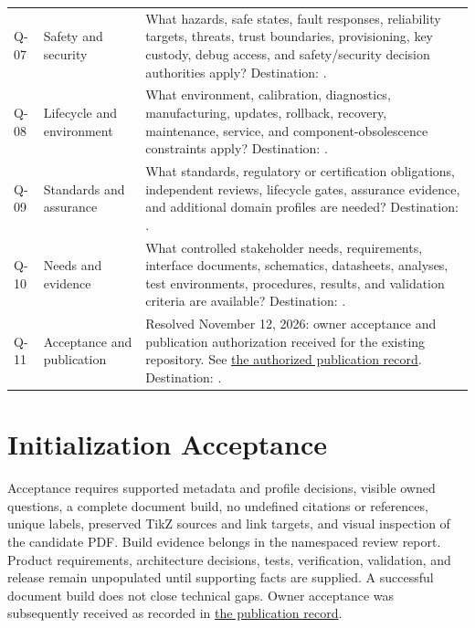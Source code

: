 \begin{tabularx}{\linewidth}{L{1.0cm}L{3.0cm}Y}
\label{Question:Q-07}Q-07 & Safety and security & What hazards, safe states, fault responses, reliability targets, threats, trust boundaries, provisioning, key custody, debug access, and safety/security decision authorities apply? Destination: .\\
\label{Question:Q-08}Q-08 & Lifecycle and environment & What environment, calibration, diagnostics, manufacturing, updates, rollback, recovery, maintenance, service, and component-obsolescence constraints apply? Destination: .\\
\label{Question:Q-09}Q-09 & Standards and assurance & What standards, regulatory or certification obligations, independent reviews, lifecycle gates, assurance evidence, and additional domain profiles are needed? Destination: .\\
\label{Question:Q-10}Q-10 & Needs and evidence & What controlled stakeholder needs, requirements, interface documents, schematics, datasheets, analyses, test environments, procedures, results, and validation criteria are available? Destination: .\\
\label{Question:Q-11}Q-11 & Acceptance and publication & Resolved November 12, 2026: owner acceptance and publication authorization received for the existing repository. See \hyperref[Section:InitializationPublication]{the authorized publication record}. Destination: .\\
\end{tabularx}
\normalsize

\section{Initialization Acceptance}
\label{Section:InitializationAcceptance}
Acceptance requires supported metadata and profile decisions, visible owned
questions, a complete document build, no undefined citations or references,
unique labels, preserved TikZ sources and link targets, and visual inspection
of the candidate PDF. Build evidence belongs in the namespaced review report.
Product requirements, architecture decisions, tests, verification, validation,
and release remain unpopulated until supporting facts are supplied.
A successful document build does not close technical gaps. Owner acceptance
was subsequently received as recorded in
\hyperref[Section:InitializationPublication]{the publication record}.
